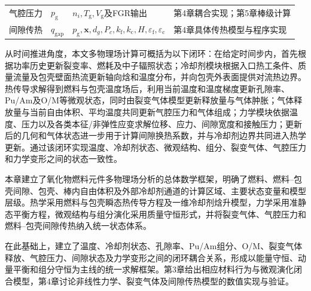 \begin{table}[htbp]
\begin{tabularx}{\textwidth}{
		>{\centering\arraybackslash}p{2.1cm}
		>{\centering\arraybackslash}p{2.0cm}
		>{\raggedright\arraybackslash}p{5.0cm}
		>{\raggedright\arraybackslash}X}
		气腔压力
		     & $p_{\mathrm g}$
		     & $n_i,T_{\mathrm g},V_{\mathrm g}$及FGR输出
		     & 第4章耦合实现；第5章棒级计算                                                                                                                     \\
		间隙传热
		     & $q_{\mathrm{gap}}$
		     & $p_{\mathrm g},\mathbf x,d_g,P_c,k_{\mathrm f},k_{\mathrm c},H,\varepsilon_{\mathrm f},\varepsilon_{\mathrm c}$
		     & 第4章具体传热模型与程序实现                                                                                                                      \\
		\bottomrule
	\end{tabularx}
\end{table}

从时间推进角度，本文多物理场计算可概括为以下闭环：在给定时间步内，首先根据功率历史更新裂变率、燃耗及中子辐照状态；冷却剂模块根据入口热工条件、质量流量及包壳壁面热流更新轴向{\rarecharfont 焓}和温度分布，并向包壳外表面提供对流热边界。热传导求解得到燃料与包壳温度场后，利用当前温度和温度梯度更新孔隙率、Pu/Am及O/M等微观状态，同时由裂变气体模型更新释放量与气体肿胀；气体释放量与当前自由体积、平均温度共同更新气腔压力和气体组成；力学模块依据温度、压力以及各类本征/非弹性应变求解位移、应力、间隙宽度和接触压力；更新后的几何和气体状态进一步用于计算间隙换热系数，并与冷却剂边界共同进入热学更新。通过该闭环实现温度、冷却剂状态、微观结构、组分、裂变气体、气腔压力和力学变形之间的状态一致性。

\label{sec:ch2_summary}

本章建立了氧化物燃料元件多物理场分析的总体数学框架，明确了燃料、燃料--包壳间隙、包壳、棒内自由体积及外部冷却剂通道的计算区域、主要状态变量和模型层级。热学采用燃料与包壳瞬态热传导方程及一维冷却剂{\rarecharfont 焓}升模型，力学采用准静态平衡方程，微观结构与组分演化采用质量守恒形式，并将裂变气体、气腔压力和燃料--包壳间隙传热纳入统一状态体系。

在此基础上，建立了温度、冷却剂状态、孔隙率、Pu/Am组分、O/M、裂变气体释放、气腔压力、间隙状态及力学变形之间的闭环耦合关系，形成以能量守恒、动量平衡和组分守恒为主线的统一求解框架。第3章给出相应材料行为与微观演化闭合模型，第4章讨论非线性力学、裂变气体及间隙传热模型的数值实现与验证。
